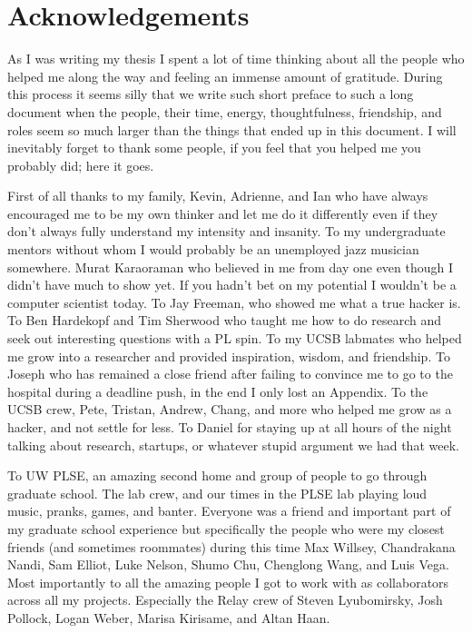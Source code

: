 \section{Acknowledgements}

As I was writing my thesis I spent a lot of time
    thinking about all the people who helped me along the way
    and feeling an immense amount of gratitude.
During this process it seems silly that we write such short preface to such a long
    document when the people, their time, energy, thoughtfulness, friendship,
    and roles seem so much larger than the things that ended up in this
    document.
I will inevitably forget to thank some people,
    if you feel that you helped me you probably did; here it goes.

First of all thanks to my family, Kevin, Adrienne, and Ian who have always encouraged
    me to be my own thinker and let me do it differently even if they don't always fully
    understand my intensity and insanity.
To my undergraduate mentors without whom I would probably be an unemployed
    jazz musician somewhere.
Murat Karaoraman who believed in me from day one even though
    I didn't have much to show yet.
If you hadn't bet on my potential
    I wouldn't be a computer scientist today.
To Jay Freeman, who showed me what a true
    hacker is.
To Ben Hardekopf and Tim Sherwood who taught me how to do research
    and seek out interesting questions with a PL spin.
To my UCSB labmates who helped me grow into a researcher and
    provided inspiration, wisdom, and friendship.
To Joseph who has remained a close friend after failing to
    convince me to go to the hospital during a deadline push,
    in the end I only lost an Appendix.
To the UCSB crew, Pete, Tristan, Andrew, Chang, and more who helped me grow
    as a hacker, and not settle for less.
To Daniel for staying up at all hours of the night talking about research,
    startups, or whatever stupid argument we had that week.

To UW PLSE, an amazing second home and group of people to
    go through graduate school.
The lab crew, and our times in the PLSE lab playing loud
    music, pranks, games, and banter.
Everyone was a friend and important part of my graduate
    school experience but specifically the people
    who were my closest friends (and sometimes roommates)
    during this time Max Willsey, Chandrakana Nandi,
    Sam Elliot, Luke Nelson, Shumo Chu, Chenglong Wang, and Luis Vega.
Most importantly to all the amazing people I got to work
    with as collaborators across all my projects.
Especially the Relay crew of Steven Lyubomirsky,
    Josh Pollock, Logan Weber, Marisa Kirisame, and Altan Haan.

